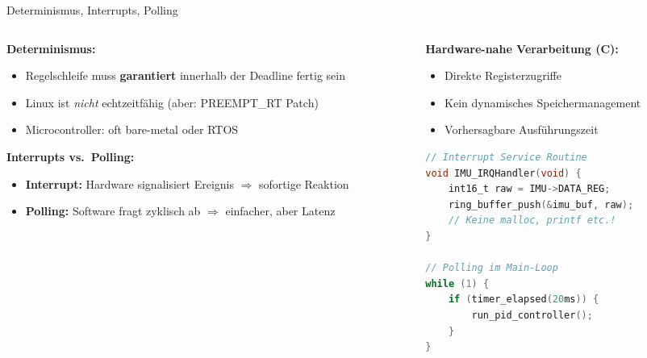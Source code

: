 \documentclass[%
  aspectratio=169,
  10pt
]{beamer}
\newcommand{\warn}[1]{{\color{blackberry}\textbf{#1}}}
\begin{document}
\begin{frame}[fragile]{Determinismus, Interrupts, Polling}

\begin{columns}[T]
  \begin{column}{0.48\textwidth}
    \textbf{Determinismus:}
    \begin{itemize}
      \item Regelschleife muss \warn{garantiert} innerhalb
            der Deadline fertig sein
      \item Linux ist \emph{nicht} echtzeitfähig
            (aber: PREEMPT\_RT Patch)
      \item Microcontroller: oft bare-metal oder RTOS
    \end{itemize}

    \vspace{2mm}
    \textbf{Interrupts vs.\ Polling:}
    \begin{itemize}
      \item \textbf{Interrupt:} Hardware signalisiert Ereignis
            $\Rightarrow$ sofortige Reaktion
      \item \textbf{Polling:} Software fragt zyklisch ab
            $\Rightarrow$ einfacher, aber Latenz
    \end{itemize}
  \end{column}
  \begin{column}{0.48\textwidth}
    \textbf{Hardware-nahe Verarbeitung (C):}
    \begin{itemize}
      \item Direkte Registerzugriffe
      \item Kein dynamisches Speichermanagement
      \item Vorhersagbare Ausführungszeit
    \end{itemize}

    \vspace{2mm}
    \begin{lstlisting}[language=C, basicstyle=\ttfamily\tiny]
// Interrupt Service Routine
void IMU_IRQHandler(void) {
    int16_t raw = IMU->DATA_REG;
    ring_buffer_push(&imu_buf, raw);
    // Keine malloc, printf etc.!
}

// Polling im Main-Loop
while (1) {
    if (timer_elapsed(20ms)) {
        run_pid_controller();
    }
}
    \end{lstlisting}
  \end{column}
\end{columns}

\end{frame}
\end{document}
